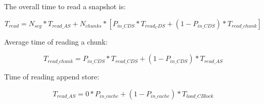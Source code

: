 The overall time to read a snapshot is:

\begin{dmath}
T_{read} = N_{seg} * {T_{read\_AS} + N_{chunks} * [P_{in\_CDS} * T_{read_CDS} + (1 - P_{in\_CDS}) * T_{read\_chunk}]}
\end{dmath}

Average time of reading a chunk:

\begin{dmath}
T_{read\_chunk} = P_{in\_CDS} * T_{read\_CDS} + (1 - P_{in\_CDS}) * T_{read\_AS}
\end{dmath}

Time of reading append store:

\begin{dmath}
T_{read\_AS} = 0 * P_{in\_cache} + (1 - P_{in\_cache} ) * T_{load\_CBlock}
\end{dmath}
